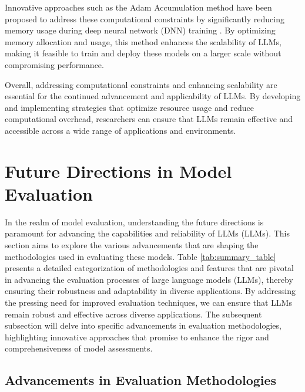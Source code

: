 Innovative approaches such as the Adam Accumulation method have been proposed to address these computational constraints by significantly reducing memory usage during deep neural network (DNN) training \cite{zhang2023adamaccumulationreducememory}. By optimizing memory allocation and usage, this method enhances the scalability of LLMs, making it feasible to train and deploy these models on a larger scale without compromising performance.



Overall, addressing computational constraints and enhancing scalability are essential for the continued advancement and applicability of LLMs. By developing and implementing strategies that optimize resource usage and reduce computational overhead, researchers can ensure that LLMs remain effective and accessible across a wide range of applications and environments.











\section{Future Directions in Model Evaluation} \label{sec:Future Directions in Model Evaluation}




In the realm of model evaluation, understanding the future directions is paramount for advancing the capabilities and reliability of LLMs (LLMs). This section aims to explore the various advancements that are shaping the methodologies used in evaluating these models. Table \ref{tab:summary_table} presents a detailed categorization of methodologies and features that are pivotal in advancing the evaluation processes of large language models (LLMs), thereby ensuring their robustness and adaptability in diverse applications. By addressing the pressing need for improved evaluation techniques, we can ensure that LLMs remain robust and effective across diverse applications. The subsequent subsection will delve into specific advancements in evaluation methodologies, highlighting innovative approaches that promise to enhance the rigor and comprehensiveness of model assessments.








\subsection{Advancements in Evaluation Methodologies} \label{subsec:Advancements in Evaluation Methodologies}

